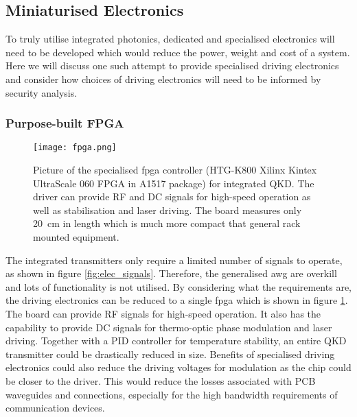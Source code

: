 


\subsection{Miniaturised Electronics}

To truly utilise integrated photonics, dedicated and specialised electronics will need to be developed which would reduce the power, weight and cost of a system. Here we will discuss one such attempt to provide specialised driving electronics and consider how choices of driving electronics will need to be informed by security analysis.

\subsubsection{Purpose-built FPGA}

\begin{figure}[t]
	\centering
	\texttt{[image: fpga.png]}
	\caption[Picture of the specialised FPGA controller for integrated QKD]{Picture of the specialised \ac{fpga} controller (HTG-K800 Xilinx Kintex UltraScale 060 FPGA in A1517 package) for integrated QKD. The driver can provide RF and DC signals for high-speed operation as well as stabilisation and laser driving. The board measures only \SI{20}{\cm} in length which is much more compact that general rack mounted equipment.}
	\label{fig:fpga}
\end{figure}

The integrated transmitters only require a limited number of signals to operate, as shown in figure \ref{fig:elec_signals}. Therefore, the generalised \ac{awg} are overkill and lots of functionality is not utilised. By considering what the requirements are, the driving electronics can be reduced to a single \ac{fpga} which is shown in figure \ref{fig:fpga}. The board can provide RF signals for high-speed operation. It also has the capability to provide DC signals for thermo-optic phase modulation and laser driving. Together with a PID controller for temperature stability, an entire \ac{QKD} transmitter could be drastically reduced in size. Benefits of specialised driving electronics could also reduce the driving voltages for modulation as the chip could be closer to the driver. This would reduce the losses associated with PCB waveguides and connections, especially for the high bandwidth requirements of communication devices. 

